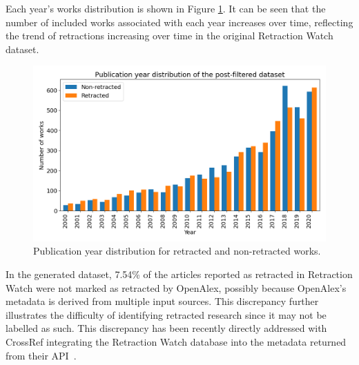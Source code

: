 \documentclass[pdflatex,sn-mathphys-num]{sn-jnl}%
\begin{document}
Each year's works distribution is shown in Figure \ref{fig:publication_parity}. It can be seen that the number of included works associated with each year increases over time, reflecting the trend of retractions increasing over time in the original Retraction Watch dataset. 
\begin{figure}
    \centering
    \includegraphics[width=1\linewidth]{output.png}
    \caption{Publication year distribution for retracted and non-retracted works.}
    \label{fig:publication_parity}
\end{figure}




In the generated dataset, 7.54\% of the articles reported as retracted in Retraction Watch were not marked as retracted by OpenAlex, possibly because OpenAlex's metadata is derived from multiple input sources. This discrepancy further illustrates the difficulty of identifying retracted research since it may not be labelled as such. This discrepancy has been recently directly addressed with CrossRef integrating the Retraction Watch database into the metadata returned from their API~\cite{rittman_retraction_2025}.
\end{document}
